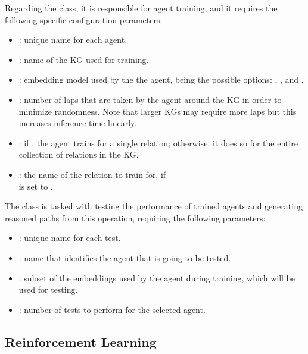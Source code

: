 Regarding the  class, it is responsible for agent training, and it requires the following specific configuration parameters: 
\begin{itemize}
    \item {}: unique name for each agent.
    \item {}: name of the KG used for training.
    \item {}:  embedding model used by the the agent, being the possible options: , ,  and .
    \item {}: number of laps that are taken by the agent around the KG in order to minimize randomness. Note that larger KGs may require more laps but this increases inference time linearly. 
    \item {}: if , the agent trains for a single relation; otherwise, it does so for the entire collection of relations in the KG.
    \item {}: the name of the relation to train for, if \\ is set to .
\end{itemize}

The  class is tasked with testing the performance of trained agents and generating reasoned paths from this operation, requiring the following parameters:

\begin{itemize}
    \item {}: unique name for each test.
    
    \item {}: name that identifies the agent that is going to be tested.
    
    \item {}: subset of the embeddings used by the agent during training, which will be used for testing.
    
    \item {}: number of tests to perform for the selected agent.
\end{itemize}

\subsection{Reinforcement Learning}\label{sec:framework-reinforcement} 

